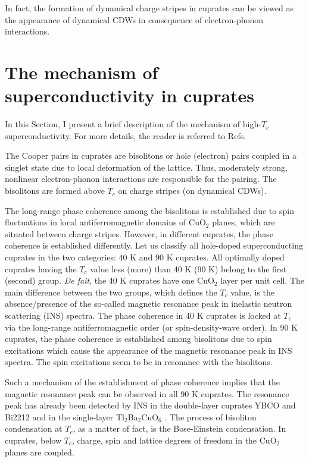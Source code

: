 In fact, the formation of dynamical charge stripes in cuprates can 
be viewed as the appearance of dynamical CDWs \cite{CDW,Mark,Bianconi} 
in consequence of electron-phonon interactions.

\section{The mechanism of superconductivity in cuprates}

In this Section, I present a brief description of the mechanism of 
high-$T_{c}$ superconductivity. For more details, the reader is referred 
to Refs\cite{AMour2,AMour3}. 

The Cooper pairs in cuprates are bisolitons or hole (electron) pairs 
coupled in a singlet state due to local deformation of the lattice. Thus, 
moderately strong, nonlinear electron-phonon interactions are responsible 
for the pairing. The bisolitons are formed above $T_{c}$ on charge stripes 
(on dynamical CDWs). 

The long-range phase coherence among the bisolitons is established due to 
spin fluctuations in local antiferromagnetic domains of CuO$_{2}$ planes, 
which are situated between charge stripes. However, in different cuprates,
the phase coherence is established differently. 
Let us classify all hole-doped superconducting cuprates in the two 
categories: 40 K and 90 K cuprates. All optimally doped cuprates having the 
$T_{c}$ value less (more) than 40 K (90 K) belong to the first (second) group. 
{\it De fait}, the 40 K cuprates have one CuO$_{2}$ layer per unit cell. 
The main difference between the two groups, which defines the $T_{c}$ 
value, is the absence/presence of the so-called magnetic resonance peak in 
inelastic neutron scattering (INS) spectra. The phase 
coherence in 40 K cuprates is locked at $T_{c}$ via the long-range 
antiferromagnetic order (or spin-density-wave order). In 90 K cuprates, the 
phase coherence is established among bisolitons due to spin excitations 
which cause the appearance of the magnetic resonance peak in INS spectra. 
The spin excitations seem to be in resonance with the bisolitons.

Such a mechanism of the establishment of phase coherence implies that 
the magnetic resonance peak can be observed in all 90 K cuprates. 
The resonance peak has already been detected by INS in the double-layer 
cuprates YBCO and Bi2212 \cite{AMour1,AMour9} and in the single-layer 
Tl$_{2}$Ba$_{2}$CuO$_{6}$ \cite{Tl2201}. The process of bisoliton 
condensation at $T_{c}$, as a matter of fact, is the Bose-Einstein 
condensation. In cuprates, below $T_{c}$, charge, spin and lattice degrees of 
freedom in the CuO$_{2}$ planes are coupled.

